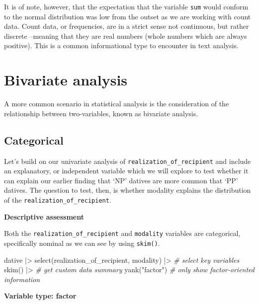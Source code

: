 \documentclass[
  letterpaper,
]{latex/krantz}
\newenvironment{Shaded}{\begin{snugshade}}{\end{snugshade}}
\newcommand{\CommentTok}[1]{\textcolor[rgb]{0.00,0.00,0.00}{\textit{#1}}}
\newcommand{\FunctionTok}[1]{\textcolor[rgb]{0.00,0.00,0.00}{#1}}
\newcommand{\NormalTok}[1]{\textcolor[rgb]{0.00,0.00,0.00}{#1}}
\newcommand{\SpecialCharTok}[1]{\textcolor[rgb]{0.00,0.00,0.00}{#1}}
\newcommand{\StringTok}[1]{\textcolor[rgb]{0.00,0.00,0.00}{#1}}
\begin{document}
It is of note, however, that the expectation that the variable
\texttt{sum} would conform to the normal distribution was low from the
outset as we are working with count data. Count data, or frequencies,
are in a strict sense not continuous, but rather discrete --meaning that
they are real numbers (whole numbers which are always positive). This is
a common informational type to encounter in text analysis.

\hypertarget{bivariate-analysis}{%
\section{Bivariate analysis}\label{bivariate-analysis}}

A more common scenario in statistical analysis is the consideration of
the relationship between two-variables, known as bivariate analysis.

\hypertarget{categorical-1}{%
\subsection{Categorical}\label{categorical-1}}

Let's build on our univariate analysis of
\texttt{realization\_of\_recipient} and include an explanatory, or
independent variable which we will explore to test whether it can
explain our earlier finding that `NP' datives are more common that `PP'
datives. The question to test, then, is whether modality explains the
distribution of the \texttt{realization\_of\_recipient}.

\textbf{Descriptive assessment}

Both the \texttt{realization\_of\_recipient} and \texttt{modality}
variables are categorical, specifically nominal as we can see by using
\texttt{skim()}.

\begin{Shaded}
\begin{Highlighting}[]
\NormalTok{dative }\SpecialCharTok{|\textgreater{}} 
  \FunctionTok{select}\NormalTok{(realization\_of\_recipient, modality) }\SpecialCharTok{|\textgreater{}} \CommentTok{\# select key variables}
  \FunctionTok{skim}\NormalTok{() }\SpecialCharTok{|\textgreater{}} \CommentTok{\# get custom data summary}
  \FunctionTok{yank}\NormalTok{(}\StringTok{"factor"}\NormalTok{) }\CommentTok{\# only show factor{-}oriented information}
\end{Highlighting}
\end{Shaded}

\textbf{Variable type: factor}
\end{document}
